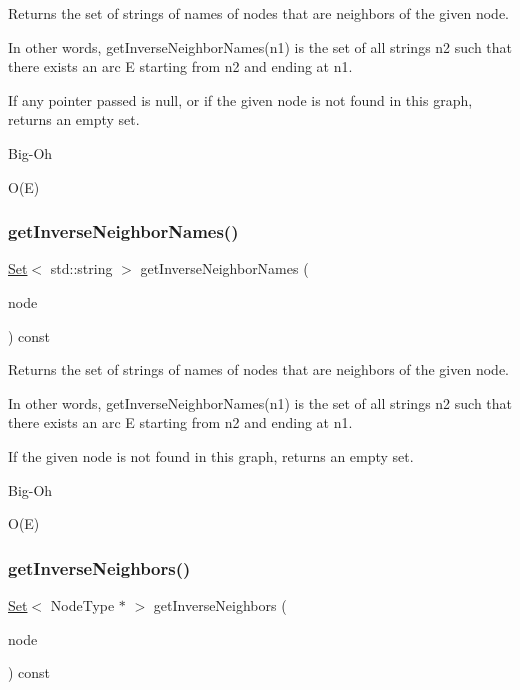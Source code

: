 Returns the set of strings of names of nodes that are neighbors of the given node. 

In other words, get\+Inverse\+Neighbor\+Names(n1) is the set of all strings n2 such that there exists an arc E starting from n2 and ending at n1.

If any pointer passed is null, or if the given node is not found in this graph, returns an empty set. \begin{DoxyRefDesc}{Big-\/\+Oh}
\item[\mbox{\hyperlink{BigOh__BigOh000067}{Big-\/\+Oh}}]O(\+E) \end{DoxyRefDesc}
\mbox{\label{classGraph_ac3dc36bc1eb0f249180cfe78bce6e7a2}} 
\subsubsection{\texorpdfstring{get\+Inverse\+Neighbor\+Names()}{getInverseNeighborNames()}\hspace{0.1cm}{\footnotesize\ttfamily [2/2]}}
{\footnotesize\ttfamily \mbox{\hyperlink{classSet}{Set}}$<$ std\+::string $>$ get\+Inverse\+Neighbor\+Names (\begin{DoxyParamCaption}\item[{const std\+::string \&}]{node }\end{DoxyParamCaption}) const}



Returns the set of strings of names of nodes that are neighbors of the given node. 

In other words, get\+Inverse\+Neighbor\+Names(n1) is the set of all strings n2 such that there exists an arc E starting from n2 and ending at n1.

If the given node is not found in this graph, returns an empty set. \begin{DoxyRefDesc}{Big-\/\+Oh}
\item[\mbox{\hyperlink{BigOh__BigOh000068}{Big-\/\+Oh}}]O(\+E) \end{DoxyRefDesc}
\mbox{\label{classGraph_a80a5724c594b9bd0b6008c57b09af317}} 
\subsubsection{\texorpdfstring{get\+Inverse\+Neighbors()}{getInverseNeighbors()}\hspace{0.1cm}{\footnotesize\ttfamily [1/2]}}
{\footnotesize\ttfamily \mbox{\hyperlink{classSet}{Set}}$<$ Node\+Type $\ast$ $>$ get\+Inverse\+Neighbors (\begin{DoxyParamCaption}\item[{Node\+Type $\ast$}]{node }\end{DoxyParamCaption}) const}




